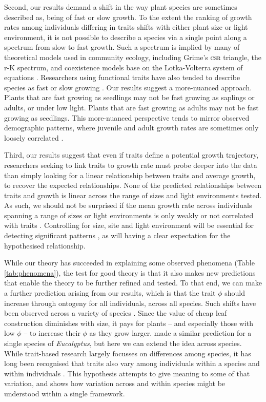 \documentclass[a4paper,11pt]{article}
\begin{document}
Second, our results demand a shift in the way plant species are sometimes described as, being of fast or slow growth. To the extent the ranking of growth rates among individuals differing in traits shifts with either plant size or light environment, it is not possible to describe a species via a single point along a spectrum from slow to fast growth. Such a spectrum is implied by many of theoretical models used in community ecology, including Grime's \textsc{csr} triangle, the r-K spectrum, and coexistence models base on the Lotka-Volterra system of equations \citep[e.g.][]{Grime-1977,Chesson-2000}. Researchers using functional traits have also tended to describe species as fast or slow growing \citep[e.g.][]{Adler-2014, Diaz-2016}. Our results suggest a more-nuanced approach. Plants that are fast growing as seedlings may not be fast growing as saplings or adults, or under low light. Plants that are fast growing as adults may not be fast growing as seedlings. This more-nuanced perspective tends to mirror observed demographic patterns, where juvenile and adult growth rates are sometimes only loosely correlated \citep{Rees-2001}.

Third, our results suggest that even if traits define a potential growth trajectory, researchers seeking to link traits to growth rate must probe deeper into the data than simply looking for a linear relationship between traits and average growth, to recover the expected relationships. None of the predicted relationships between traits and growth is linear across the range of sizes and light environments tested. As such, we should not be surprised if the mean growth rate across individuals spanning a range of sizes or light environments is only weakly or not correlated with traits \citep[e.g.][]{Poorter-2008,Paine-2015}. Controlling for size, site and light environment will be essential for detecting significant patterns \citep[e.g.][]{Gibert-2016}, as will having a clear expectation for the hypothesised relationship.

While our theory has succeeded in explaining some observed phenomena (Table \ref{tab:phenomena}), the test for good theory is that it also makes new predictions that enable the theory to be further refined and tested. To that end, we can make a further prediction arising from our results, which is that the trait $\phi$ should increase through ontogeny for all individuals, across all species. Such shifts have been observed across a variety of species \citet{King-1999,Thomas-1999,Koch-2004}. Since the value of cheap leaf construction diminishes with size, it pays for plants -- and especially those with low $\phi$ -- to increase their $\phi$ as they grow larger. \citet{King-1999} made a similar prediction for a single species of \emph{Eucalyptus}, but here we can extend the idea across species. While trait-based research largely focusses on differences among species, it has long been recognised that traits also vary among individuals within a species and within individuals \citep{Westoby-2002}. This hypothesis attempts to give meaning to some of that variation, and shows how variation across and within species might be understood within a single framework.
\end{document}
